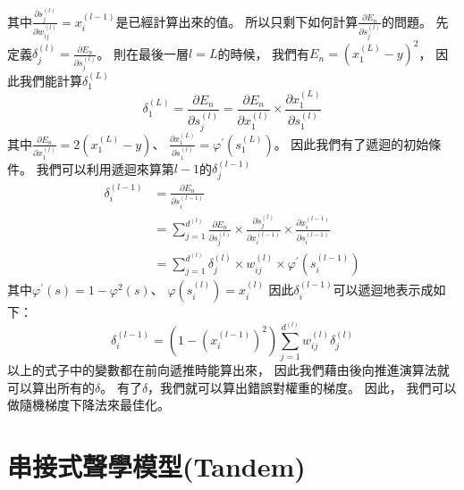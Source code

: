   其中$\frac{\partial s_j^{(l)}}{\partial w_{ij}^{(l)}} = x_i^{(l-1)}$是已經計算出來的值。
  所以只剩下如何計算$\frac{\partial E_n}{\partial s_j^{(l)}}$的問題。
  先定義$\delta_j^{(l)} = \frac{\partial E_n}{\partial s_j^{(l)}}$。
  則在最後一層$l = L$的時候，
  我們有$E_n = (x_1^{(L)} - y)^2$，
  因此我們能計算$\delta_1^{(L)}$
  \begin{equation}
    \delta_1^{(L)} = \frac{\partial E_n}{\partial s_j^{(l)}} 
    = \frac{\partial E_n}{\partial x_1^{(l)}} \times \frac{\partial x_1^{(L)}}{\partial s_1^{(l)}}
  \end{equation}
  其中$\frac{\partial E_n}{\partial x_1^{(l)}} = 2(x_1^{(L)} - y)$、
  $\frac{\partial x_1^{(L)}}{\partial s_1^{(l)}} = \varphi^{'}(s_1^{(L)})$。
  因此我們有了遞迴的初始條件。
  我們可以利用遞迴來算第$l-1$的$\delta_j^{(l-1)}$
  \begin{equation}
    \begin{split}
      \delta_i^{(l-1)} 
      &= \frac{\partial E_n}{\partial s_i^{(l-1)}} \\
      &= \sum_{j=1}^{d^{(l)}} \frac{\partial E_n}{\partial s_j^{(l)}} \times 
      \frac{\partial s_j^{(l)}}{\partial x_i^{(l-1)}} \times
      \frac{\partial x_i^{(l-1)}}{\partial s_i^{(l-1)}} \\
      &= \sum_{j=1}^{d^{(l)}} \delta_j^{(l)} \times w_{ij}^{(l)} \times \varphi^{'}(s_i^{(l-1)})
    \end{split}
  \end{equation}
  其中$\varphi^{'}(s) = 1 - \varphi^2(s)$、
  $\varphi(s_i^{(l)}) = x_i^{(l)}$
  因此$\delta_i^{(l-1)}$可以遞迴地表示成如下：
  \begin{equation}
    \delta_i^{(l-1)} = \left( 1 - (x_i^{(l-1)})^2 \right) \sum_{j=1}^{d^{(l)}} w_{ij}^{(l)} \delta_j^{(l)}
  \end{equation}
  以上的式子中的變數都在前向遞推時能算出來，
  因此我們藉由後向推進演算法就可以算出所有的$\delta$。
  有了$\delta$，我們就可以算出錯誤對權重的梯度。
  因此，
  我們可以做隨機梯度下降法來最佳化。

\section{串接式聲學模型(Tandem)}
  \usetikzlibrary{calc,trees,positioning,arrows,chains,shapes.geometric,%
      decorations.pathreplacing,decorations.pathmorphing,shapes,%
      matrix,shapes.symbols}


